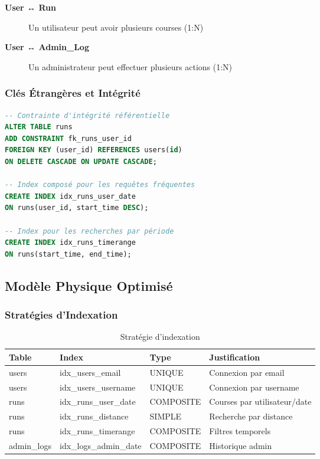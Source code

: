 \begin{description}
    \item[\textbf{User ↔ Run}] Un utilisateur peut avoir plusieurs courses (1:N)
    \item[\textbf{User ↔ Admin\_Log}] Un administrateur peut effectuer plusieurs actions (1:N)
\end{description}

\subsubsection{Clés Étrangères et Intégrité}

\begin{lstlisting}[language=sql]
-- Contrainte d'intégrité référentielle
ALTER TABLE runs 
ADD CONSTRAINT fk_runs_user_id 
FOREIGN KEY (user_id) REFERENCES users(id) 
ON DELETE CASCADE ON UPDATE CASCADE;

-- Index composé pour les requêtes fréquentes
CREATE INDEX idx_runs_user_date 
ON runs(user_id, start_time DESC);

-- Index pour les recherches par période
CREATE INDEX idx_runs_timerange 
ON runs(start_time, end_time);
\end{lstlisting}

\subsection{Modèle Physique Optimisé}

\subsubsection{Stratégies d'Indexation}

\begin{table}[H]
\centering
\begin{tabular}{|l|l|l|p{5cm}|}
\hline
\textbf{Table} & \textbf{Index} & \textbf{Type} & \textbf{Justification} \\
\hline
users & idx\_users\_email & UNIQUE & Connexion par email \\
users & idx\_users\_username & UNIQUE & Connexion par username \\
runs & idx\_runs\_user\_date & COMPOSITE & Courses par utilisateur/date \\
runs & idx\_runs\_distance & SIMPLE & Recherche par distance \\
runs & idx\_runs\_timerange & COMPOSITE & Filtres temporels \\
admin\_logs & idx\_logs\_admin\_date & COMPOSITE & Historique admin \\
\hline
\end{tabular}
\caption{Stratégie d'indexation}
\end{table}

